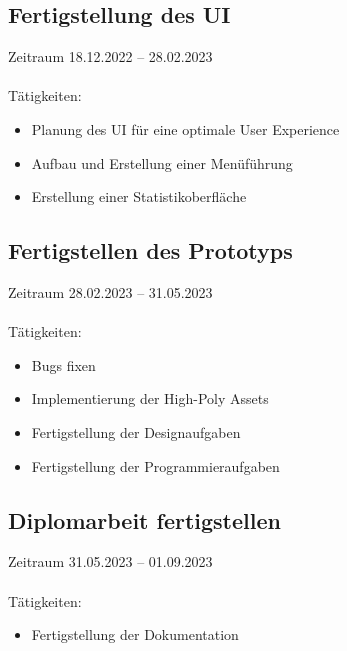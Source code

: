 \subsection{Fertigstellung des UI}
Zeitraum 18.12.2022 – 28.02.2023\\\\
Tätigkeiten:
\begin{itemize}
    \item Planung des UI für eine optimale User Experience
    \item Aufbau und Erstellung einer Menüführung
    \item Erstellung einer Statistikoberfläche
\end{itemize}

\subsection{Fertigstellen des Prototyps}
Zeitraum 28.02.2023 – 31.05.2023\\\\
Tätigkeiten:
\begin{itemize}
    \item Bugs fixen
    \item Implementierung der High-Poly Assets
    \item Fertigstellung der Designaufgaben
    \item Fertigstellung der Programmieraufgaben
\end{itemize}

\subsection{Diplomarbeit fertigstellen}
Zeitraum 31.05.2023 – 01.09.2023\\\\
Tätigkeiten:
\begin{itemize}
    \item Fertigstellung der Dokumentation
\end{itemize}


\pagebreak

